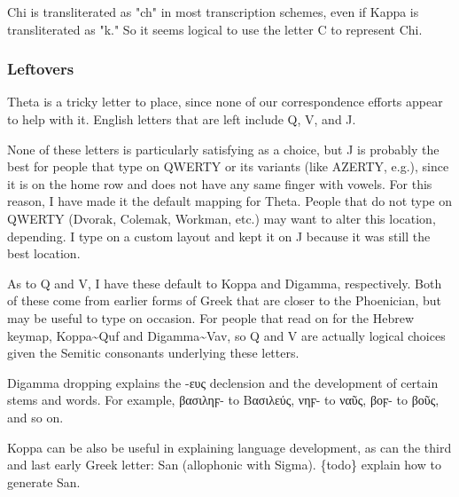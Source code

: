 \documentclass[11pt]{article}
\begin{document}
Chi is transliterated as "ch" in most transcription schemes, even if Kappa is transliterated as "k." So it seems logical to use the letter C to represent Chi.

\subsubsection{Leftovers}
\label{sec:org2731e64}

Theta is a tricky letter to place, since none of our correspondence efforts appear to help with it. English letters that are left include Q, V, and J.

None of these letters is particularly satisfying as a choice, but J is probably the best for people that type on QWERTY or its variants (like AZERTY, e.g.), since it is on the home row and does not have any same finger with vowels. For this reason, I have made it the default mapping for Theta. People that do not type on QWERTY (Dvorak, Colemak, Workman, etc.) may want to alter this location, depending. I type on a custom layout and kept it on J because it was still the best location.

As to Q and V, I have these default to Koppa and Digamma, respectively. Both of these come from earlier forms of Greek that are closer to the Phoenician, but may be useful to type on occasion. For people that read on for the Hebrew keymap, Koppa\textasciitilde{}Quf and Digamma\textasciitilde{}Vav, so Q and V are actually logical choices given the Semitic consonants underlying these letters.

Digamma dropping explains the -ευς declension and the development of certain stems and words. For example, βασιληϝ- to Βασιλεύς, νηϝ- to ναῦς, βοϝ- to βοῦς, and so on.

Koppa can be also be useful in explaining language development, as can the third and last early Greek letter: San (allophonic with Sigma). \{todo\} explain how to generate San.
\end{document}
